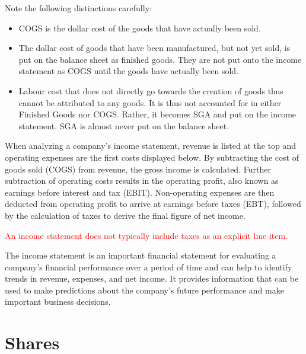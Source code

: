 \documentclass{article}
\begin{document}
Note the following distinctions carefully:
\begin{itemize}
    \item COGS is the dollar cost of the goods that have actually been sold.
    \item The dollar cost of goods that have been manufactured, but not yet sold, is put on the balance sheet as finished goods. They are not put onto the income statement as COGS until the goods have actually been sold.
    \item Labour cost that does not directly go towards the creation of goods thus cannot be attributed to any goods. It is thus not accounted for in either Finished Goods nor COGS. Rather, it becomes SGA and put on the income statement. SGA is almost never put on the balance sheet. 
\end{itemize}

When analyzing a company's income statement, revenue is listed at the top and operating expenses are the first costs displayed below. By subtracting the cost of goods sold (COGS) from revenue, the gross income is calculated. Further subtraction of operating costs results in the operating profit, also known as earnings before interest and tax (EBIT). Non-operating expenses are then deducted from operating profit to arrive at earnings before taxes (EBT), followed by the calculation of taxes to derive the final figure of net income.

\textcolor{red}{An income statement does not typically include taxes as an explicit line item.}

The income statement is an important financial statement for evaluating a company's financial performance over a period of time and can help to identify trends in revenue, expenses, and net income. It provides information that can be used to make predictions about the company's future performance and make important business decisions.


\section{Shares}
\end{document}
